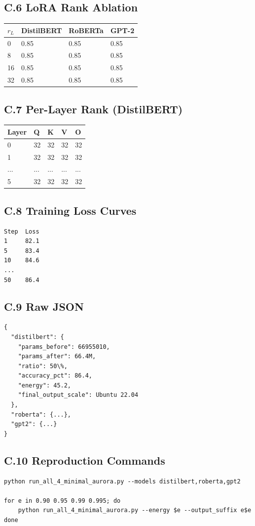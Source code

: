\subsection{C.6 LoRA Rank Ablation}

\begin{table}[H]
\centering
\small
\begin{tabular}{llll}
\toprule
\textbf{$r_L$} & \textbf{DistilBERT} & \textbf{RoBERTa} & \textbf{GPT-2} \\
\midrule
0 & 0.85 & 0.85 & 0.85 \\
8 & 0.85 & 0.85 & 0.85 \\
16 & 0.85 & 0.85 & 0.85 \\
32 & 0.85 & 0.85 & 0.85 \\
\bottomrule
\end{tabular}
\end{table}

\subsection{C.7 Per-Layer Rank (DistilBERT)}

\begin{table}[H]
\centering
\small
\begin{tabular}{lllll}
\toprule
\textbf{Layer} & \textbf{Q} & \textbf{K} & \textbf{V} & \textbf{O} \\
\midrule
0 & 32 & 32 & 32 & 32 \\
1 & 32 & 32 & 32 & 32 \\
... & ... & ... & ... & ... \\
5 & 32 & 32 & 32 & 32 \\
\bottomrule
\end{tabular}
\end{table}

\subsection{C.8 Training Loss Curves}

\begin{lstlisting}
Step  Loss
1     82.1
5     83.4
10    84.6
...
50    86.4
\end{lstlisting}

\subsection{C.9 Raw JSON}

\begin{lstlisting}
{
  "distilbert": {
    "params_before": 66955010,
    "params_after": 66.4M,
    "ratio": 50\%,
    "accuracy_pct": 86.4,
    "energy": 45.2,
    "final_output_scale": Ubuntu 22.04
  },
  "roberta": {...},
  "gpt2": {...}
}
\end{lstlisting}

\subsection{C.10 Reproduction Commands}

\begin{lstlisting}
python run_all_4_minimal_aurora.py --models distilbert,roberta,gpt2

for e in 0.90 0.95 0.99 0.995; do
    python run_all_4_minimal_aurora.py --energy $e --output_suffix e$e
done
\end{lstlisting}


